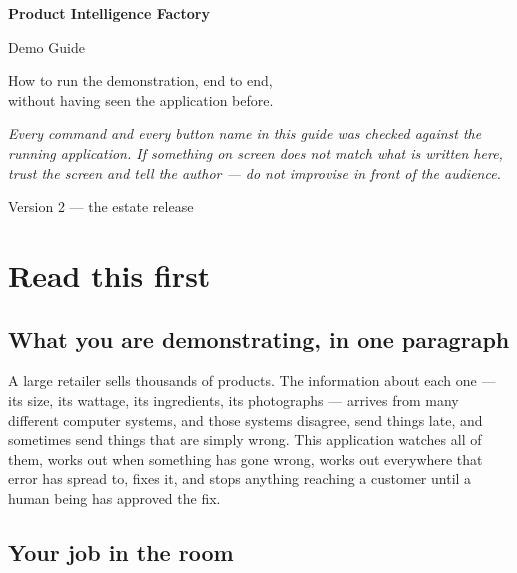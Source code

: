 \documentclass[11pt,a4paper]{article}
\begin{document}
\begin{titlepage}
\centering
\vspace*{3cm}
{\Huge\bfseries\color{accent} Product Intelligence Factory\par}
\vspace{0.6cm}
{\LARGE Demo Guide\par}
\vspace{2cm}
{\large How to run the demonstration, end to end,\\
without having seen the application before.\par}
\vspace{3cm}
\begin{minipage}{0.8\textwidth}
\centering\itshape\color{quiet}
Every command and every button name in this guide was checked against the
running application. If something on screen does not match what is written
here, trust the screen and tell the author --- do not improvise in front of
the audience.
\end{minipage}
\vfill
{\color{quiet}\small Version 2 --- the estate release\par}
\end{titlepage}

\tableofcontents
\newpage

\section{Read this first}

\subsection{What you are demonstrating, in one paragraph}

A large retailer sells thousands of products. The information about each one ---
its size, its wattage, its ingredients, its photographs --- arrives from many
different computer systems, and those systems disagree, send things late, and
sometimes send things that are simply wrong. This application watches all of
them, works out when something has gone wrong, works out everywhere that error
has spread to, fixes it, and stops anything reaching a customer until a human
being has approved the fix.

\subsection{Your job in the room}
\end{document}
